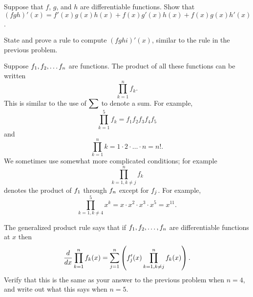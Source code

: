 \exercise
Suppose that $f$, $g$, and $h$ are differentiable functions.
Show that $(fgh)'(x) = f'(x) g(x)h(x) + f(x)g'(x) h(x) + f(x) g(x)
h'(x)$.
\endexercise

\exercise
State and prove a rule to compute $(fghi)'(x)$, 
similar to the rule in the previous problem.

Suppose $\displaystyle f_1 , f_2 , \ldots f_n$ are functions.
The product of all these functions can be written
$$ \prod _{k=1 } ^n f_k.$$
This is similar to the use of $\displaystyle \sum$ to denote a 
sum.
For example,
$$\prod _{k=1 } ^5 f_k =f_1 f_2 f_3 f_4 f_5$$
and
$$
\prod _ {k=1 } ^n k = 1\cdot 2 \cdot \ldots \cdot n = n!.$$
We sometimes use somewhat more complicated conditions; for example
$$\prod _{k=1 , k\neq j } ^n f_k$$
denotes the product of $\displaystyle f_1$ through $\displaystyle f_n$ except for $\displaystyle f_j$.
For example, 
$$\prod _{k=1 , k\neq 4} ^5 x^k = x\cdot x^2 \cdot x^3 \cdot x^5 =
x^{11}.$$
\endremark
\endexercise

\exercise
  The {\dfont generalized product rule\/} 
says that if $\displaystyle f_1 , f_2 ,\ldots ,f_n$ are differentiable functions at
  $x$ then
$${d\over dx}\prod _{k=1 } ^n f_k(x) = 
\sum _{j=1 } ^n \left(f'_j (x) \prod _{k=1 , k\neq j} ^n
   f_k (x)\right).$$
Verify that this is the same as your answer to the previous problem
when $n=4$,
and write out what this says when $n=5$.

\endexercise

\endexercises

